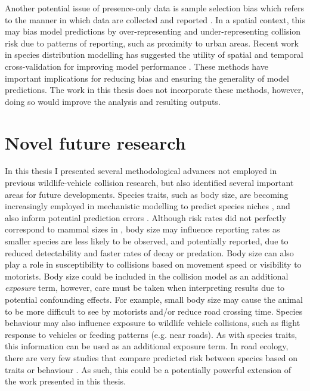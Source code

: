 Another potential issue of presence-only data is sample selection bias which refers to the manner in which data are collected and reported \citep{phil09}. In a spatial context, this may bias model predictions by over-representing and under-representing collision risk due to patterns of reporting, such as proximity to urban areas. Recent work in species distribution modelling has suggested the utility of spatial and temporal cross-validation for improving model performance \citep{weng12,robe17}. These methods have important implications for reducing bias and ensuring the generality of model predictions. The work in this thesis does not incorporate these methods, however, doing so would improve the analysis and resulting outputs.

\section{Novel future research}

In this thesis I presented several methodological advances not employed in previous wildlife-vehicle collision research, but also identified several important areas for future developments. Species traits, such as body size, are becoming increasingly employed in mechanistic modelling to predict species niches \citep{kear09}, and also  inform potential prediction errors \citep[e.g.][]{seoa05}. Although risk rates did not perfectly correspond to mammal sizes in , body size may influence reporting rates as smaller species are less likely to be observed, and potentially reported, due to reduced detectability and faster rates of decay or predation. Body size can also play a role in susceptibility to collisions based on movement speed \citep{jaar06} or visibility to motorists. Body size could be included in the collision model as an additional \textit{exposure} term, however, care must be taken when interpreting results due to potential confounding effects. For example, small body size may cause the animal to be more difficult to see by motorists and/or reduce road crossing time. Species behaviour may also influence exposure to wildlife vehicle collisions, such as flight response to vehicles \citep{deva14,lee10} or feeding patterns (e.g. near roads). As with species traits, this information can be used as an additional exposure term. In road ecology, there are very few studies that compare predicted risk between species based on traits or behaviour \citep[but see][]{litv08}. As such, this could be a potentially powerful extension of the work presented in this thesis. 

